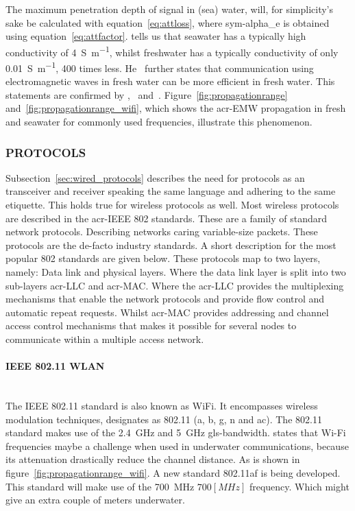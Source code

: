The maximum penetration depth of signal in (sea) water, will, for simplicity’s sake be calculated with 
equation~\ref{eq:attloss}, where \gls{sym-alpha_e} is obtained using equation~\ref{eq:attfactor}.
\citet{jiang_electromagnetic_2011} tells us that seawater has a typically high conductivity of 
\SI{4}{\siemens\per\meter}, whilst freshwater has a typically conductivity of only \SI{0.01}{\siemens\per\meter}, 
\num{400} times less.
He~\cite{jiang_electromagnetic_2011} further states that communication using electromagnetic waves in fresh water can
be more efficient in fresh water.
This statements are confirmed by \citet{jiang_electromagnetic_2011},~\citet{ainslie_principles_2010} 
and~\citet{bogie_conduction_1972}.
Figure~\ref{fig:propagationrange} and~\ref{fig:propagationrange_wifi}, which shows the \gls{acr-EMW} propagation in 
fresh and seawater for commonly used frequencies, illustrate this phenomenon.

\subsubsection{PROTOCOLS}
Subsection~\ref{sec:wired_protocols} describes the need for protocols as an transceiver and receiver speaking the 
same language and adhering to the same etiquette. This holds true for wireless protocols as well. Most wireless 
protocols are described in the \gls{acr-IEEE} 802 standards. These are a family of standard network protocols. 
Describing networks caring variable-size packets. These protocols are the de-facto industry standards. A short 
description for the most popular 802 standards are given below. These protocols map to two layers, namely: Data link 
and physical layers. Where the data link layer is split into two sub-layers \gls{acr-LLC} and \gls{acr-MAC}. Where 
the \gls{acr-LLC} provides the multiplexing mechanisms that enable the network protocols and provide flow control and
automatic repeat requests. Whilst \gls{acr-MAC} provides addressing and channel access control mechanisms that makes 
it possible for several nodes to communicate within a multiple access network.

\paragraph{IEEE 802.11 WLAN} \hfil \\
The IEEE 802.11 standard is also known as WiFi. It encompasses wireless modulation techniques, designates as 802.11
(a, b, g, n and ac). The 802.11 standard makes use of the \SI{2.4}{\giga\hertz} and \SI{5}{\giga\hertz} 
\gls{gls-bandwidth}. \citet{freitas_evaluation_2014} states that Wi-Fi frequencies maybe a challenge when used in 
underwater communications, because its attenuation drastically reduce the channel distance. As is shown in 
figure~\ref{fig:propagationrange_wifi}.
A new standard 802.11af is being developed. This standard will make use of the \SI{700}{\mega\hertz} $ 700 [MHz] $ 
frequency. Which might give an extra couple of meters underwater.

